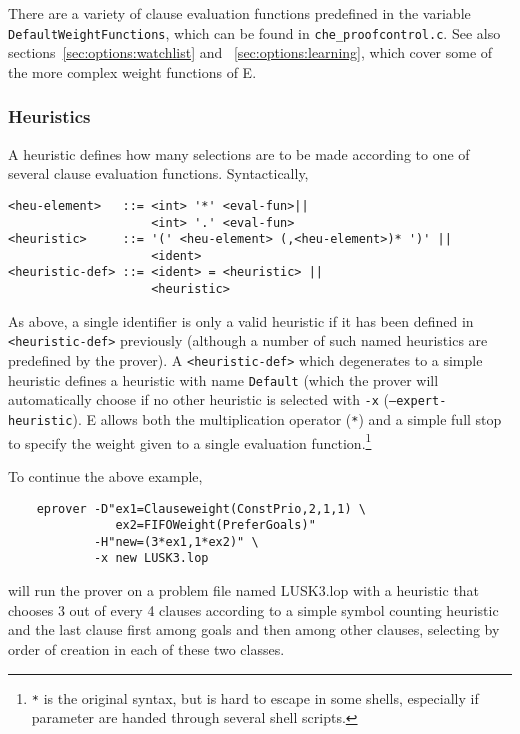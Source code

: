 \documentclass{report}
\begin{document}
There are a variety of clause evaluation functions predefined in
the variable \texttt{DefaultWeightFunctions}, which can be found in
\texttt{che\_proofcontrol.c}. See also
sections~\ref{sec:options:watchlist} and ~\ref{sec:options:learning},
which cover some of the more complex weight functions of E.


\subsubsection{Heuristics}

A heuristic defines how many selections are to be made according to
one of several clause evaluation functions. Syntactically,

\begin{verbatim}
<heu-element>   ::= <int> '*' <eval-fun>||
                    <int> '.' <eval-fun>
<heuristic>     ::= '(' <heu-element> (,<heu-element>)* ')' ||
                    <ident>
<heuristic-def> ::= <ident> = <heuristic> ||
                    <heuristic>
\end{verbatim}

As above, a single identifier is only a valid heuristic if it has been
defined in \texttt{<heuristic-def>} previously (although a number of
such named heuristics are predefined by the prover). A
\texttt{<heuristic-def>} which degenerates to a simple heuristic
defines a heuristic with name \texttt{Default} (which the prover will
automatically choose if no other heuristic is selected with
\texttt{-x} (\texttt{--expert-heuristic}). E allows both the
multiplication operator (\texttt{*}) and a simple full stop to specify
the weight given to a single evaluation function.\footnote{\texttt{*}
  is the original syntax, but is hard to escape in some shells,
  especially if parameter are handed through several shell scripts.}

\begin{example}
  To continue the above example,
\begin{verbatim}
    eprover -D"ex1=Clauseweight(ConstPrio,2,1,1) \
               ex2=FIFOWeight(PreferGoals)"
            -H"new=(3*ex1,1*ex2)" \
            -x new LUSK3.lop
\end{verbatim}
  will run the prover on a problem file named LUSK3.lop with a
  heuristic that chooses 3 out of every 4 clauses according to a
  simple symbol counting heuristic and the last clause first among
  goals and then among other clauses, selecting by order of creation
  in each of these two classes.
\end{example}
\end{document}
